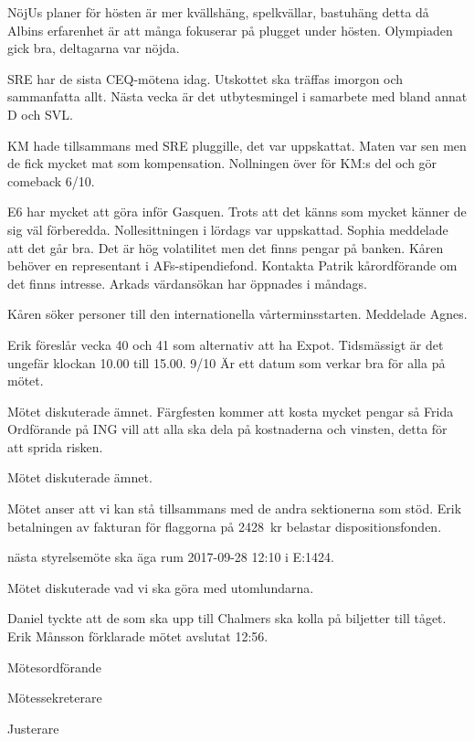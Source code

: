 \documentclass[10pt]{article}
\def\mo{Erik Månsson}
\def\ms{Johan Karlberg}
\def\ji{Niklas Gustafson}
\begin{document}
\begin{paragrafer}
\begin{paragrafer}
NöjUs planer för hösten är mer kvällshäng, spelkvällar, bastuhäng detta då Albins erfarenhet är att många fokuserar på plugget under hösten. Olympiaden gick bra, deltagarna var nöjda.

SRE har de sista CEQ-mötena idag. Utskottet ska träffas imorgon och sammanfatta allt. Nästa vecka är det utbytesmingel i samarbete med bland annat D och SVL.

KM hade tillsammans med SRE pluggille, det var uppskattat. Maten var sen men de fick mycket mat som kompensation. Nollningen över för KM:s del och gör comeback 6/10.

E6 har mycket att göra inför Gasquen. Trots att det känns som mycket känner de sig väl förberedda. Nollesittningen i lördags var uppskattad.
Sophia meddelade att det går bra. Det är hög volatilitet men det finns pengar på banken.
Kåren behöver en representant i AFs-stipendiefond. Kontakta Patrik kårordförande om det finns intresse. Arkads värdansökan har öppnades i måndags.

Kåren söker personer till den internationella vårterminsstarten. Meddelade Agnes.
\end{paragrafer}

Erik föreslår vecka 40 och 41 som alternativ att ha Expot. Tidsmässigt är det ungefär klockan 10.00 till 15.00. 9/10 Är ett datum som verkar bra för alla på mötet.

Mötet diskuterade ämnet.
Färgfesten kommer att kosta mycket pengar så Frida Ordförande på ING vill att alla ska dela på kostnaderna och vinsten, detta för att sprida risken.

Mötet diskuterade ämnet.

Mötet anser att vi kan stå tillsammans med de andra sektionerna som stöd.
Erik \ypa betalningen av fakturan för flaggorna på \SI{2428}{kr} belastar dispositionsfonden.

\Mbaby
{}
{\Mba} nästa styrelsemöte ska äga rum 2017-09-28 12:10 i E:1424.

{\Ibfu}

Mötet diskuterade vad vi ska göra med utomlundarna.

Daniel tyckte att de som ska upp till Chalmers ska kolla på biljetter till tåget.
{\mo} förklarade mötet avslutat 12:56.

\end{paragrafer}

\hidesignfoot
\begin{signatures}{3}
\signature{\mo}{Mötesordförande}
\signature{\ms}{Mötessekreterare}
\signature{\ji}{Justerare}
\end{signatures}
\end{document}
